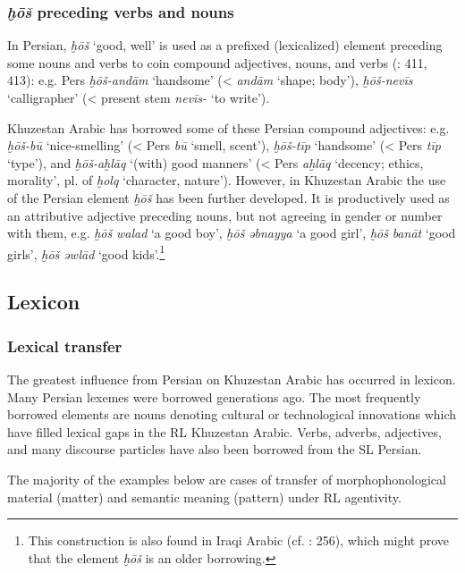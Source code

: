 \documentclass[output=paper,nonflat]{langsci/langscibook}
\begin{document}
\subsubsection{\textit{ḫōš} preceding verbs and nouns} \label{xosh}

In Persian, \textit{ḫōš} ‘good, well’ is used as a prefixed (lexicalized) element preceding some nouns and verbs to coin compound adjectives, nouns, and verbs (\citealt{Majidi1990}: 411, 413): e.g. Pers \textit{ḫōš-andām} ‘handsome’ (< \textit{andām} ‘shape; body’), \textit{ḫōš-nevīs} ‘calligrapher’ (< present stem \textit{nevīs-} ‘to write’).

Khuzestan Arabic has borrowed some of these Persian compound adjectives: e.g. \textit{ḫōš-bū} ‘nice-smelling’ (< Pers \textit{bū} ‘smell, scent’), \textit{ḫōš-tīp} ‘handsome’ (< Pers \textit{tīp} ‘type’), and \textit{ḫōš-aḫlāq} ‘(with) good manners’ (< Pers \textit{aḫlāq} ‘decency; ethics, morality’, pl. of \textit{ḫolq} ‘character, nature’). However, in Khuzestan Arabic the use of the Persian element \textit{ḫōš} has been further developed. It is productively used as an attributive adjective preceding nouns, but not agreeing in gender or number with them, e.g. \textit{ḫōš} \textit{walad} ‘a good boy’, \textit{ḫōš} \textit{əbnayya} ‘a good girl’, \textit{ḫōš} \textit{banāt} ‘good girls’, \textit{ḫōš} \textit{əwlād} ‘good kids’.\footnote{This construction is also found in Iraqi Arabic (cf. \citealt{Erwin1963}: 256), which might prove that the element \textit{ḫōš} is an older borrowing.}



\subsection{Lexicon}
\subsubsection{Lexical transfer}

The greatest influence from Persian on Khuzestan Arabic has occurred in lexicon. Many Persian lexemes were borrowed generations ago. The most frequently borrowed elements are nouns denoting cultural or technological innovations which have filled lexical gaps in the RL Khuzestan Arabic. Verbs, adverbs, adjectives, and many discourse particles have also been borrowed from the SL Persian.

The majority of the examples below are cases of transfer of morphophonological material (matter) and semantic meaning (pattern) under RL agentivity. 
\end{document}
